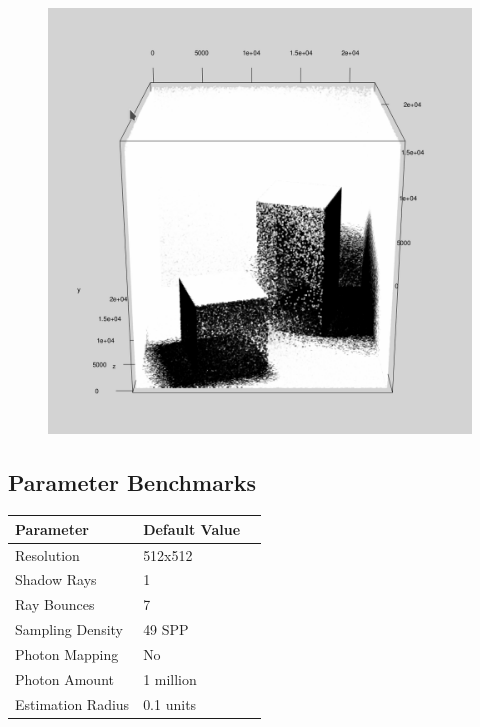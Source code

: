 \documentclass[a4paper, twocolumn]{article}
\begin{document}
            \begin{figure}[H]
                \centering
                \includegraphics[width=0.8\linewidth]{share/photon_map.png}
                \label{fig:photon_map}
            \end{figure}

        \subsection*{Parameter Benchmarks}

            \begin{table}[H]
            \centering
            \begin{tabular}{lll}
                \toprule
                \textbf{Parameter}&\textbf{Default Value}\\
                \midrule
                Resolution&512x512\\
                Shadow Rays&1\\
                Ray Bounces&7\\
                Sampling Density&49 SPP\\
                Photon Mapping&No\\
                Photon Amount&1 million\\
                Estimation Radius &0.1 units\\
                \bottomrule
            \end{tabular}
            \label{tab:shadow_rays}
            \end{table}
\end{document}
